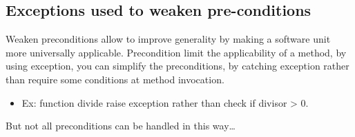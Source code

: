 \subsection{Exceptions used to weaken pre-conditions}

Weaken preconditions allow to improve generality by making a software
unit more universally applicable. Precondition limit the applicability
of a method, by using exception, you can simplify the preconditions, by
catching exception rather than require some conditions at method
invocation. 

\begin{itemize}
\item Ex: function divide raise exception rather than check if divisor > 0.
    \end{itemize}

But not all preconditions can be handled in this way\ldots
